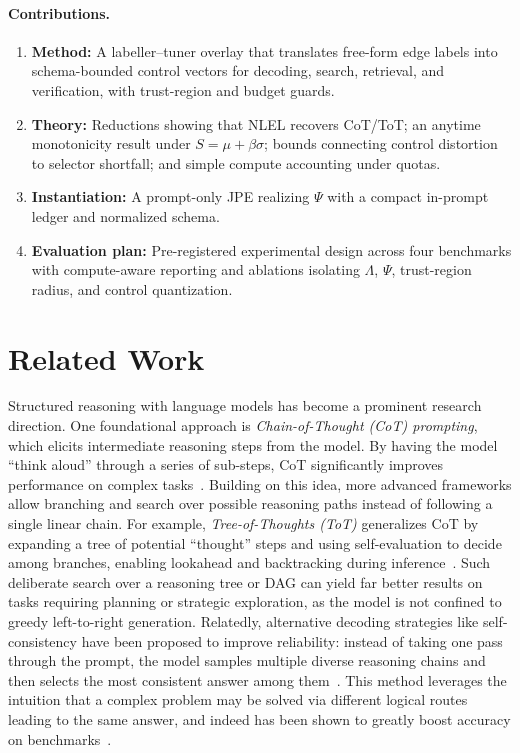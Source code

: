 \documentclass{article}
\theoremstyle{plain}
\theoremstyle{definition}
\theoremstyle{remark}
\begin{document}
\paragraph{Contributions.}
\begin{enumerate}
\item \textbf{Method:} A labeller--tuner overlay that translates free-form edge labels into schema-bounded control vectors for decoding, search, retrieval, and verification, with trust-region and budget guards.
\item \textbf{Theory:} Reductions showing that NLEL recovers CoT/ToT; an anytime monotonicity result under \(S=\mu+\beta\sigma\); bounds connecting control distortion to selector shortfall; and simple compute accounting under quotas.
\item \textbf{Instantiation:} A prompt-only JPE realizing \(\Psi\) with a compact in-prompt ledger and normalized schema.
\item \textbf{Evaluation plan:} Pre-registered experimental design across four benchmarks with compute-aware reporting and ablations isolating \(\Lambda\), \(\Psi\), trust-region radius, and control quantization.
\end{enumerate}

\section{Related Work}

Structured reasoning with language models has become a prominent research direction. One foundational approach is \emph{Chain-of-Thought (CoT) prompting}, which elicits intermediate reasoning steps from the model. By having the model ``think aloud'' through a series of sub-steps, CoT significantly improves performance on complex tasks~\cite{wei2022chain}. Building on this idea, more advanced frameworks allow branching and search over possible reasoning paths instead of following a single linear chain. For example, \emph{Tree-of-Thoughts (ToT)} generalizes CoT by expanding a tree of potential ``thought'' steps and using self-evaluation to decide among branches, enabling lookahead and backtracking during inference~\cite{yao2023tree}. Such deliberate search over a reasoning tree or DAG can yield far better results on tasks requiring planning or strategic exploration, as the model is not confined to greedy left-to-right generation. Relatedly, alternative decoding strategies like self-consistency have been proposed to improve reliability: instead of taking one pass through the prompt, the model samples multiple diverse reasoning chains and then selects the most consistent answer among them~\cite{wang2022selfconsistency}. This method leverages the intuition that a complex problem may be solved via different logical routes leading to the same answer, and indeed has been shown to greatly boost accuracy on benchmarks~\cite{wang2022selfconsistency}.
\end{document}
